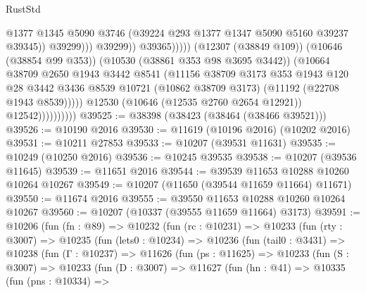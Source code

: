 \begin{lexlean}{RustStd}
\begin{coremodule}
                                                @1377
                                                @1345
                                                @5090
                                                @3746
                                                (@39224 @293 @1377 @1347 @5090 @5160 @39237 @39345))
                                              @39299)))
                                        @39299))
                                    @39365)))))
                          (@12307 (@38849 @109))
                          (@10646 (@38854 @99 @353))
                          (@10530 (@38861 @353 @98 @3695 @3442))
                          (@10664
                            @38709
                            @2650
                            @1943
                            @3442
                            @8541
                            (@11156
                              @38709
                              @3173
                              @353
                              @1943
                              @120
                              @28
                              @3442
                              @3436
                              @8539
                              @10721
                              (@10862 @38709 @3173)
                              (@11192 (@22708 @1943 @8539)))))
                        @12530
                        (@10646 (@12535 @2760 @2654 @12921))
                        @12542))))))))))
@39525 := @38398 (@38423 (@38464 (@38466 @39521)))
@39526 := @10190 @2016
@39530 := @11619 (@10196 @2016) (@10202 @2016)
@39531 := @10211 @27853
@39533 := @10207 (@39531 @11631)
@39535 := @10249 (@10250 @2016)
@39536 := @10245 @39535
@39538 := @10207 (@39536 @11645)
@39539 := @11651 @2016
@39544 := @39539 @11653 @10288 @10260 @10264 @10267
@39549 := @10207 (@11650 (@39544 @11659 @11664) @11671)
@39550 := @11674 @2016
@39555 := @39550 @11653 @10288 @10260 @10264 @10267
@39560 := @10207 (@10337 (@39555 @11659 @11664) @3173)
@39591 := @10206
    (fun (fn : @89) =>
    @10232
      (fun (rc : @10231) =>
      @10233
        (fun (rty : @3007) =>
        @10235
          (fun (lets0 : @10234) =>
          @10236
            (fun (tail0 : @3431) =>
            @10238
              (fun (Γ : @10237) =>
              @11626
                (fun (ps : @11625) =>
                @10233
                  (fun (S : @3007) =>
                  @10233
                    (fun (D : @3007) =>
                    @11627
                      (fun (hn : @41) =>
                      @10335
                        (fun (pns : @10334) =>

\end{coremodule}
\end{lexlean}

